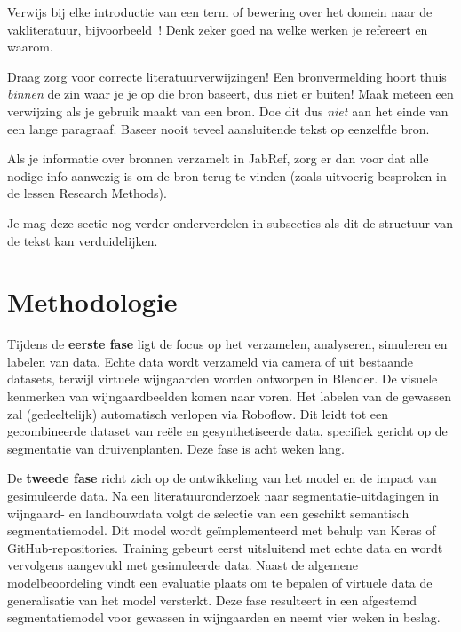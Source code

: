 Verwijs bij elke introductie van een term of bewering over het domein naar de vakliteratuur, bijvoorbeeld~\autocite{Hykes2013}! Denk zeker goed na welke werken je refereert en waarom.

Draag zorg voor correcte literatuurverwijzingen! Een bronvermelding hoort thuis \emph{binnen} de zin waar je je op die bron baseert, dus niet er buiten! Maak meteen een verwijzing als je gebruik maakt van een bron. Doe dit dus \emph{niet} aan het einde van een lange paragraaf. Baseer nooit teveel aansluitende tekst op eenzelfde bron.

Als je informatie over bronnen verzamelt in JabRef, zorg er dan voor dat alle nodige info aanwezig is om de bron terug te vinden (zoals uitvoerig besproken in de lessen Research Methods).


Je mag deze sectie nog verder onderverdelen in subsecties als dit de structuur van de tekst kan verduidelijken.

\section{Methodologie}%
\label{sec:methodologie}

Tijdens de \textbf{eerste fase} ligt de focus op het verzamelen, analyseren, simuleren en labelen van data. Echte data wordt verzameld via camera of uit bestaande datasets, terwijl virtuele wijngaarden worden ontworpen in Blender. De visuele kenmerken van wijngaardbeelden komen naar voren. Het labelen van de gewassen zal (gedeeltelijk) automatisch verlopen via Roboflow. Dit leidt tot een gecombineerde dataset van reële en gesynthetiseerde data, specifiek gericht op de segmentatie van druivenplanten. Deze fase is acht weken lang.

De \textbf{tweede fase} richt zich op de ontwikkeling van het model en de impact van gesimuleerde data. Na een literatuuronderzoek naar segmentatie-uitdagingen in wijngaard- en landbouwdata volgt de selectie van een geschikt semantisch segmentatiemodel. Dit model wordt geïmplementeerd met behulp van Keras of GitHub-repositories. Training gebeurt eerst uitsluitend met echte data en wordt vervolgens aangevuld met gesimuleerde data. Naast de algemene modelbeoordeling vindt een evaluatie plaats om te bepalen of virtuele data de generalisatie van het model versterkt. Deze fase resulteert in een afgestemd segmentatiemodel voor gewassen in wijngaarden en neemt vier weken in beslag.

